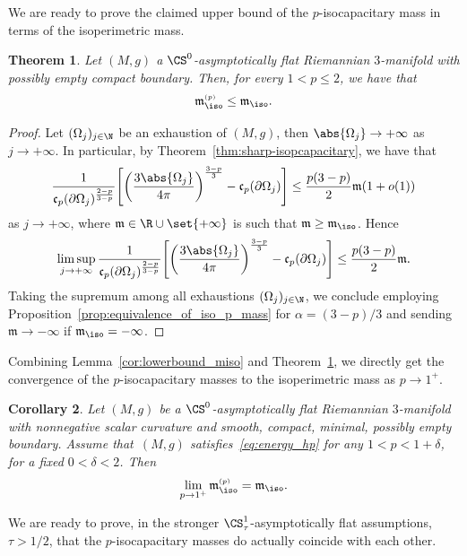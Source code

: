 \documentclass[10pt,a4paper]{amsart}
\numberwithin{equation}{section}
\newtheorem{Theorem}{Theorem}[section]
\newtheorem{Corollary}[Theorem]{Corollary}
\renewcommand{\ncapa}{\mathfrak{c}}
\newcommand{\ma}{\mathfrak{m}}
\newcommand{\tp}[1][p]{{\text{\tiny$(#1)$}}}
\begin{document}
We are ready to prove the claimed upper bound of the $p$-isocapacitary mass in terms of the isoperimetric mass.

\begin{Theorem}\label{thm:upperbound_miso}
Let $(M,g)$ a $\CS^0$-asymptotically flat Riemannian $3$-manifold with possibly empty compact boundary. Then, for every $1<p\leq 2$, we have that
\[
 \ma^{\tp}_{\iso} \leq \ma_{\iso}.
\]
\end{Theorem}

\begin{proof} Let $(\Omega_j)_{j \in \N}$ be an exhaustion of $(M,g)$, then $\abs{\Omega_j}\to +\infty$ as $j \to +\infty$. In particular, by Theorem~\ref{thm:sharp-isopcapacitary}, we have that
\[
 \frac{1}{\ncapa_p(\partial \Omega_j)^{\frac{2-p}{3-p}}} \Bigg[\bigg(\frac{3 \abs{\Omega_j}}{4 \pi }\bigg)^{\frac{3-p}{3}} - \ncapa_p(\partial\Omega_j) \Bigg] \leq \frac{p(3-p)}{2}\ma(1+o(1))
\]
as $j\to +\infty$, where $\ma\in \R\cup\set{+\infty}$ is such that $\ma\geq \ma_{\iso}$. Hence
\[
 \limsup_{j \to +\infty}\frac{1}{\ncapa_p(\partial \Omega_j)^{\frac{2-p}{3-p}}} \Bigg[\bigg(\frac{3 \abs{\Omega_j}}{4 \pi }\bigg)^{\frac{3-p}{3}} - \ncapa_p(\partial\Omega_j) \Bigg] \leq \frac{p(3-p)}{2}\ma.
\]
Taking the supremum among all exhaustions $(\Omega_j)_{j \in \N}$, we conclude employing Proposition~\ref{prop:equivalence_of_iso_p_mass} for $\alpha = (3-p)/3$ and sending $\ma\to - \infty$ if $\ma_{\iso}=-\infty$. \end{proof}

Combining Lemma~\ref{cor:lowerbound_miso} and Theorem~\ref{thm:upperbound_miso}, we directly get the convergence of the $p$-iso\-ca\-pac\-i\-tary masses to the isoperimetric mass as $p \to 1^+$.

\begin{Corollary}%
Let $(M,g)$ be a $\CS^0$-asymptotically flat Riemannian $3$-manifold with nonnegative scalar curvature and smooth, compact, minimal, possibly empty boundary. Assume that~$(M,g)$ satisfies~\eqref{eq:energy_hp} for any $1 < p < 1 + \delta$, for a fixed $0 < \delta < 2$. Then
\[
 \lim_{p\to 1^+} \ma^{\tp}_{\iso} = \ma_{\iso}.
\]
\end{Corollary}

We are ready to prove, in the stronger $\CS^1_\tau$-asymptotically flat assumptions, $\tau>1/2$, that the $p$-isocapacitary masses do actually coincide with each other.
\end{document}
